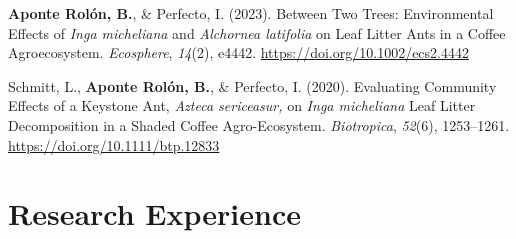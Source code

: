 \documentclass[11pt,a4paper,]{awesome-cv}
\begin{document}
\hypertarget{bibliography}{}
\leavevmode{}%
\textbf{Aponte Rolón, B.}, \& Perfecto, I. (2023). Between Two Trees:
Environmental Effects of \emph{Inga micheliana} and
\emph{Alchornea latifolia} on Leaf Litter Ants in a Coffee
Agroecosystem. \emph{Ecosphere}, \emph{14}(2), e4442.
\url{https://doi.org/10.1002/ecs2.4442}

\leavevmode{}%
Schmitt, L., \textbf{Aponte Rolón, B.}, \& Perfecto, I. (2020).
Evaluating Community Effects of a Keystone Ant,
\emph{Azteca sericeasur,} on \emph{Inga micheliana} Leaf Litter
Decomposition in a Shaded Coffee Agro-Ecosystem. \emph{Biotropica},
\emph{52}(6), 1253--1261. \url{https://doi.org/10.1111/btp.12833}

\hypertarget{research-experience}{%
\section{\texorpdfstring{ Research
Experience}{ Research Experience}}\label{research-experience}}
\end{document}
